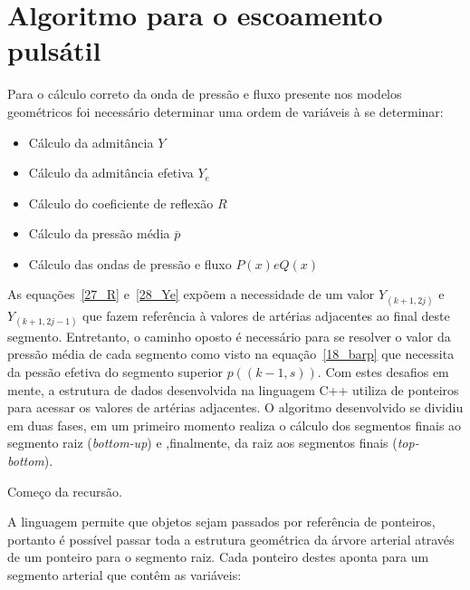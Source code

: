\documentclass[
        english,			
        brazil			        %
        ,<...>]{abntbibufjf}
\begin{document}
\section{Algoritmo para o escoamento pulsátil}
\label{sec:algoritmo}

Para o cálculo correto da onda de pressão e fluxo presente nos modelos geométricos foi necessário determinar uma ordem de variáveis à se determinar:

\begin{itemize}
    \item Cálculo da admitância $Y$
    \item Cálculo da admitância efetiva $Y_e$
    \item Cálculo do coeficiente de reflexão $R$
    \item Cálculo da pressão média $\bar{p}$
    \item Cálculo das ondas de pressão e fluxo $P(x) e Q(x)$
\end{itemize}

As equações~\eqref{27_R} e~\eqref{28_Ye} expõem a necessidade de um valor $Y_(k+1,2j)$ e $Y_(k+1,2j-1)$ que fazem referência à valores de artérias adjacentes ao final deste segmento.
Entretanto, o caminho oposto é necessário para se resolver o valor da pressão média de cada segmento como visto na equação~\eqref{18_barp} que necessita da pessão efetiva do segmento superior $p((k-1,s))$.
Com estes desafios em mente, a estrutura de dados desenvolvida na linguagem C++ utiliza de ponteiros para acessar os valores de artérias adjacentes. O algoritmo desenvolvido se dividiu em duas fases, em um primeiro momento realiza o cálculo dos segmentos finais ao segmento raiz (\textit{bottom-up}) e ,finalmente, da raiz aos segmentos finais (\textit{top-bottom}).


\begin{algorithm}[H]
	\SetAlgoLined
\caption{Começo da recursão.}
\end{algorithm}

A linguagem permite que objetos sejam passados por referência de ponteiros, portanto é possível passar toda a estrutura geométrica da árvore arterial através de um ponteiro para o segmento raiz. Cada ponteiro destes aponta para um segmento arterial que contêm as variáveis:
\end{document}
